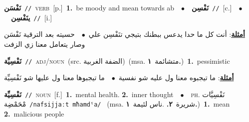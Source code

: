 \documentclass[10pt,a4paper,twoside]{article} %
\begin{document}
\begin{multicols}{2}
{\setlength\topsep{0pt}\textbf{\foreignlanguage{arabic}{نَفْسَن}}\ {\color{gray}\texttt{//}\color{black}}\ \textsc{verb}\ [p.]\ \textbf{1.}~be moody and mean towards ab\ \ $\bullet$\ \ \setlength\topsep{0pt}\textbf{\foreignlanguage{arabic}{نَفْسِن}}\ {\color{gray}\texttt{//}\color{black}}\ [c.]\ \ $\bullet$\ \ \setlength\topsep{0pt}\textbf{\foreignlanguage{arabic}{ينَفْسِن}}\ {\color{gray}\texttt{//}\color{black}}\ [i.]\  \begin{flushright}\color{gray}\foreignlanguage{arabic}{\textbf{\underline{\foreignlanguage{arabic}{أمثلة}}}: أنت كل ما حدا يدعس ببطنك بتيجي تنَفْسِن علي\ $\bullet$\ \  حسيته بعد الترقية نَفْسَن وصار يتعامل معنا زي الزفت}\end{flushright}\color{black}} \vspace{2mm}

{\setlength\topsep{0pt}\textbf{\foreignlanguage{arabic}{نَفْسِيِّة}}\ {\color{gray}\texttt{//}\color{black}}\ \textsc{adj/noun}\ (src. \color{gray}\foreignlanguage{arabic}{الضفة الغربية}\color{black})\ \color{gray}(msa. \foreignlanguage{arabic}{متشائمة}~\foreignlanguage{arabic}{\textbf{١.}})\color{black}\ \textbf{1.}~pessimistic\  \begin{flushright}\color{gray}\foreignlanguage{arabic}{\textbf{\underline{\foreignlanguage{arabic}{أمثلة}}}: ما تيجبوه معنا ول عليه شو نفسية\ $\bullet$\ \  ما تيجبوها معنا ول عليها شو نَفْسِيِّة}\end{flushright}\color{black}} \vspace{2mm}

{\setlength\topsep{0pt}\textbf{\foreignlanguage{arabic}{نَفْسِيِّة}}\ {\color{gray}\texttt{//}\color{black}}\ \textsc{noun}\ [f.]\ \textbf{1.}~mental health.  \textbf{2.}~inner thought\ \ $\bullet$\ \ \textsc{ph.} \color{gray} \foreignlanguage{arabic}{نَفْسِيَّات مْحَمْضِة}\color{black}\ {\color{gray}\texttt{/{\sffamily nafsijjaːt mħamdˤa}/}\color{black}}\ \color{gray} (msa. \foreignlanguage{arabic}{شريرة}~\foreignlanguage{arabic}{\textbf{٢.}}  .\foreignlanguage{arabic}{ناس لئيمة}~\foreignlanguage{arabic}{\textbf{١.}})\color{black}\ \textbf{1.}~mean  \textbf{2.}~malicious people\ } \vspace{2mm}


\end{multicols}
\end{document}
